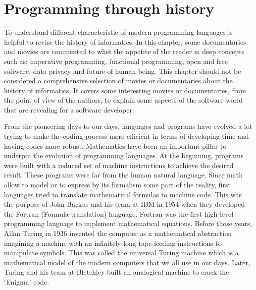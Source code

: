  
 
 
 
 
 
 
% 
% 




\newpage 
\section{Programming through history}   \label{sec:films}
To understand different characteristic of modern programming languages
is helpful to revise the history of informatics. In this chapter, 
some documentaries and movies are commented to whet the appetite of the 
reader in deep concepts such as: imperative programming, functional programming, 
open and free software, data privacy and future of human being. 
This chapter should not be considered  a comprehensive selection of movies 
or documentaries about the history of informatics. 
It covers some interesting movies or documentaries, 
from the point of view of the authors, to explain some aspects 
of the software world that are revealing for a software 
developer.  
  
From the pioneering days to our days, languages and programs have evolved 
a lot trying to make the coding process more efficient in terms of developing time 
and having codes more robust. Mathematics have been an important pillar to underpin
the evolution of programming  languages. 
At the beginning, programs were built with a reduced set of machine instructions 
to achieve the desired result. These programs were far from the human natural language.
Since math allow to model or to express by its formalism some part of the reality, first 
languages tried to translate mathematical formulas to machine code. This was the purpose 
of John Backus and his team at IBM in 1954 when they developed 
the Fortran (Formula-translation) language. 
Fortran was the first high-level programming language to implement mathematical equations. 
Before those years, Allan Turing in 1936 invented the computer as a mathematical  abstraction 
imagining a machine with an infinitely long tape feeding instructions to manipulate symbols. 
This was called the universal Turing machine 
which is a mathematical model of the modern computers that we all use in our days. 
Later, Turing and his team at Bletchley built an analogical machine 
to crack the ‘Enigma’ code. 
  

